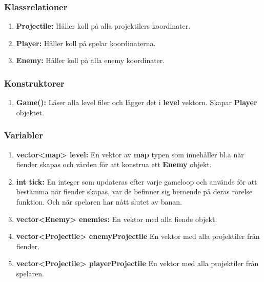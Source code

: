\documentclass{TDP005mall}
\begin{document}
\subsubsection*{Klassrelationer}
\begin{enumerate}
  \item \textbf{Projectile: } Håller koll på alla projektilers koordinater.
  \item \textbf{Player: } Håller koll på spelar koordinaterna.
  \item \textbf{Enemy: } Håller koll på alla enemy koordinater.
 \end{enumerate}
 \subsubsection*{Konstruktorer}
 \begin{enumerate}
   \item \textbf{Game():} Läser alla level filer och lägger det i \textbf{level} vektorn. 
                          Skapar \textbf{Player} objektet.
 \end{enumerate}
 \subsubsection*{Variabler}
 \begin{enumerate}
   \item \textbf{vector<map> level:} En vektor av \textbf{map} typen som innehåller bl.a när fiender skapas och värden för att konstrua ett \textbf{Enemy} objekt.
   \item \textbf{int tick:} En integer som updateras efter varje gameloop och används för att bestämma när fiender skapas, var de befinner sig beroende på deras rörelse funktion.
                            Och när spelaren har nått slutet av banan.
    \item \textbf{vector<Enemy> enemies: } En vektor med alla fiende objekt.
    \item \textbf{vector<Projectile> enemyProjectile} En vektor med alla projektiler från fiender.
    \item \textbf{vector<Projectile> playerProjectile} En vektor med alla projektiler från spelaren.
 \end{enumerate}
\end{document}

